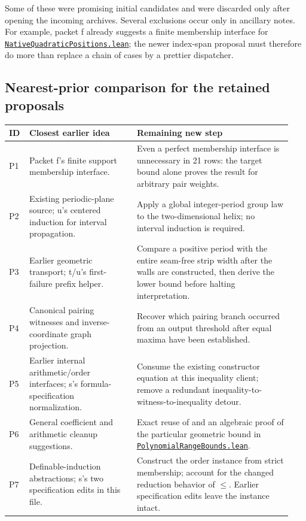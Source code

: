 \documentclass[11pt,letterpaper]{article}
\newcommand{\code}[1]{\texttt{\detokenize{#1}}}
\newcommand{\base}{https://github.com/VladimirReshetnikov/ProveIt/blob/553a5f7a463cbaab8800ff8148fef0bc5a9e1b22/Computability/DiophantineConsistency/Lean/DiophantineConsistency/}
\newcommand{\source}[1]{\href{\base#1.lean}{\nolinkurl{#1.lean}}}
\begin{document}
Some of these were promising initial candidates and were discarded only after opening the incoming archives. Several exclusions occur only in ancillary notes. For example, packet f already suggests a finite membership interface for \source{NativeQuadraticPositions}; the newer index-span proposal must therefore do more than replace a chain of \code{Finset.mem_insert} cases by a prettier dispatcher.

\subsection{Nearest-prior comparison for the retained proposals}

\begin{longtable}{@{}p{0.06\linewidth}p{0.36\linewidth}p{0.52\linewidth}@{}}
\toprule ID & Closest earlier idea & Remaining new step \\
\midrule\endhead
P1 & Packet f's finite support membership interface. & Even a perfect membership interface is unnecessary in 21 rows: the target bound alone proves the result for arbitrary pair weights. \\
P2 & Existing periodic-plane source; u's centered induction for interval propagation. & Apply a global integer-period group law to the two-dimensional helix; no interval induction is required. \\
P3 & Earlier geometric transport; t/u's first-failure prefix helper. & Compare a positive period with the entire seam-free strip width after the walls are constructed, then derive the lower bound before halting interpretation. \\
P4 & Canonical pairing witnesses and inverse-coordinate graph projection. & Recover which pairing branch occurred from an output threshold after equal maxima have been established. \\
P5 & Earlier internal arithmetic/order interfaces; s's formula-specification normalization. & Consume the existing constructor equation at this inequality client; remove a redundant inequality-to-witness-to-inequality detour. \\
P6 & General coefficient and arithmetic cleanup suggestions. & Exact reuse of \code{mul_geom_sum} and an algebraic proof of the particular geometric bound in \source{PolynomialRangeBounds}. \\
P7 & Definable-induction abstractions; s's two specification edits in this file. & Construct the order instance from strict membership; account for the changed reduction behavior of $\le$. Earlier specification edits leave the instance intact. \\
\bottomrule
\end{longtable}
\end{document}
